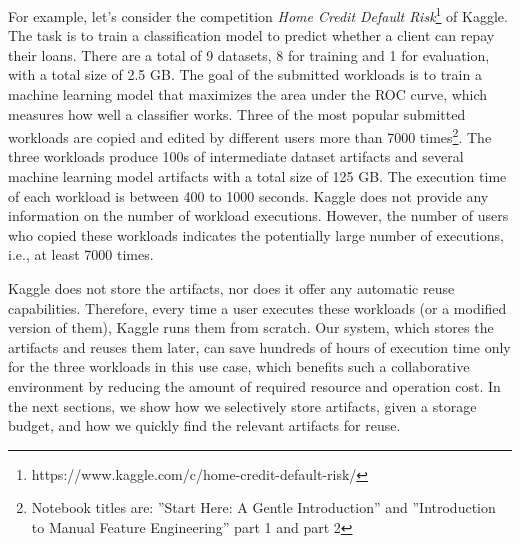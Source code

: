 For example, let's consider the competition \textit{Home Credit Default Risk}\footnote{https://www.kaggle.com/c/home-credit-default-risk/} of Kaggle.
The task is to train a classification model to predict whether a client can repay their loans.
There are a total of 9 datasets, 8 for training and 1 for evaluation, with a total size of 2.5 GB.
The goal of the submitted workloads is to train a machine learning model that maximizes the area under the ROC curve, which measures how well a classifier works.
Three of the most popular submitted workloads are copied and edited by different users more than 7000 times\footnote{Notebook titles are: ''Start Here: A Gentle Introduction'' and ''Introduction to Manual Feature Engineering'' part 1 and part 2}.
The three workloads produce 100s of intermediate dataset artifacts and several machine learning model artifacts with a total size of 125 GB.
The execution time of each workload is between 400 to 1000 seconds.
Kaggle does not provide any information on the number of workload executions.
However, the number of users who copied these workloads indicates the potentially large number of executions, i.e., at least 7000 times.

Kaggle does not store the artifacts, nor does it offer any automatic reuse capabilities.
Therefore, every time a user executes these workloads (or a modified version of them), Kaggle runs them from scratch.
Our system, which stores the artifacts and reuses them later, can save hundreds of hours of execution time only for the three workloads in this use case, which benefits such a collaborative environment by reducing the amount of required resource and operation cost.
In the next sections, we show how we selectively store artifacts, given a storage budget, and how we quickly find the relevant artifacts for reuse.